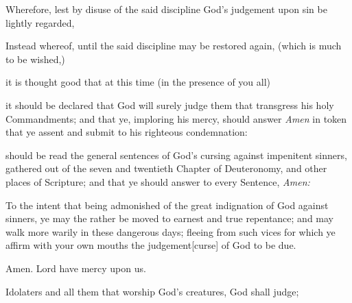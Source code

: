 




\begin{multicols}{2}{
Wherefore, lest by disuse of the said discipline God’s judgement upon sin be lightly regarded, 

Instead whereof, until the said discipline may be restored again, (which is much to be wished,)
}\end{multicols}
it is thought good that at this time (in the presence of you all)

\begin{multicols}{2}{
it should be declared that God will surely judge them that transgress his holy Commandments; and that ye, imploring his mercy, should answer \emph{Amen} in token that ye assent and submit to his righteous condemnation:

\medskip

should be read the general sentences of God’s cursing against impenitent sinners, gathered out of the seven and twentieth Chapter of Deuteronomy, and other places of Scripture; and that ye should answer to every Sentence, \emph{Amen:}
}\end{multicols}

To the intent that being admonished of the great indignation of God against sinners, ye may the rather be moved to earnest and true repentance; and may walk more warily in these dangerous days; fleeing from such vices for which ye affirm with your own mouths the judgement[curse] of God to be due.


\centerline{}

\R Amen.  Lord have mercy upon us.

Idolaters and all them that worship God’s creatures, God shall judge;

